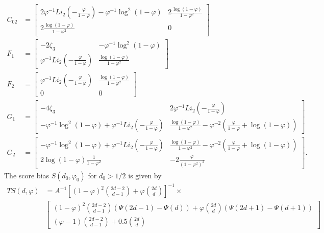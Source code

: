 {{\begin{theorem}
\begin{align*}
C_{02} &= \begin{bmatrix}
 2 \varphi^{-1} Li_{2}(-\frac{\varphi}{1-\varphi}) - \varphi^{-1} \log^2(1-\varphi)  & 2 \frac{\log(1 - \varphi)}{1-\varphi^2} \\
 2 \frac{\log(1 - \varphi)}{1-\varphi^2} & 0
\end{bmatrix} \\
  F_{1} &= \begin{bmatrix}
-2 \zeta_3 & -\varphi^{-1}\log^2(1-\varphi)   \\
  \varphi^{-1} Li_{2}(-\frac{\varphi}{1-\varphi}) &  \frac{\log(1-\varphi)}{1-\varphi^2}
\end{bmatrix} \\
F_{2} &= \begin{bmatrix}
  \varphi^{-1} Li_{2}(-\frac{\varphi}{1-\varphi})   & \frac{\log(1-\varphi)}{1-\varphi^2}\\
 0  & 0
\end{bmatrix} \\
   G_{1} &= \begin{bmatrix}
-4 \zeta_3 &  2 \varphi^{-1} Li_2(-\frac{\varphi}{1-\varphi}) \\
 - \varphi^{-1} \log^2(1- \varphi) + \varphi^{-1} Li_2(-\frac{\varphi}{1-\varphi}) & \frac{\log(1-\varphi)}{1-\varphi^2} - \varphi^{-2} \left(\frac{\varphi }{1-\varphi } + \log(1-\varphi )\right) 
\end{bmatrix}  \\
 G_{2} &= \begin{bmatrix}
 - \varphi^{-1} \log^2(1- \varphi) + \varphi^{-1} Li_2(-\frac{\varphi}{1-\varphi})  & \frac{\log(1-\varphi)}{1-\varphi^2} - \varphi^{-2} \left(\frac{\varphi }{1-\varphi } + \log(1-\varphi )\right) \\
2\log(1-\varphi) \frac{1}{1-\varphi^2}& -2 \frac{\varphi}{(1-\varphi^2)^2}
\end{bmatrix}.
\end{align*}
The score bias $S(d_0,\varphi_0) $ for $d_0 > 1/2$ is given by
\begin{align*}
     T S(d,\varphi)  &= A^{-1} \left[ (1-\varphi)^2 \binom{2d-2}{d-1} +  \varphi  \binom{2d}{d} \right]^{-1} \times
     \\ 
     &\begin{bmatrix} (1-\varphi)^2  \binom{2d-2}{d-1} 
     \left( \Psi(2d-1)-\Psi(d) \right)  + \varphi  \binom{2d}{d} \left( \Psi(2d+1)-\Psi(d+1) \right)
  \\
(\varphi- 1)   \binom{2d-2}{d-1}  +  0.5\binom{2d}{d}
\end{bmatrix}

\end{align*}
\end{theorem}}}
